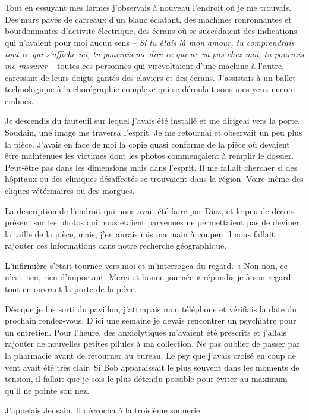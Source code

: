 Tout en essuyant mes larmes j'observais à nouveau l'endroit où je me trouvais. Des murs pavés de carreaux d'un blanc
éclatant, des machines ronronnantes et bourdonnantes d'activité électrique, des écrans où se succédaient des indications
qui n'avaient pour moi aucun sens -- \emph{Si tu étais là mon amour, tu comprendrais tout ce qui s'affiche ici, tu
pourrais me dire ce qui ne va pas chez moi, tu pourrais me rassurer} -- toutes ces personnes qui virevoltaient d'une
machine à l'autre, caressant de leurs doigts gantés des claviers et des écrans. J'assistais à un ballet technologique à 
la chorégraphie complexe qui se déroulait sous mes yeux encore embués.

Je descendis du fauteuil sur lequel j'avais été installé et me dirigeai vers la porte. Soudain, une image me traversa
l'esprit. Je me retournai et observait un peu plus la pièce. J'avais en face de moi la copie quasi conforme de la pièce
où devaient être maintenues les victimes dont les photos commençaient à remplir le dossier. Peut-être pas dans les
dimensions mais dans l'esprit. Il me fallait chercher si des hôpitaux ou des cliniques désaffectés se trouvaient dans la
région. Voire même des cliques vétérinaires ou des morgues.

La description de l'endroit qui nous avait été faire par Diaz, et le peu de décors présent sur les photos qui nous
étaient parvenues ne permettaient pas de deviner la taille de la pièce, mais, j'en aurais mis ma main à couper, il nous
fallait rajouter ces informations dans notre recherche géographique.

L'infirmière s'était tournée vers moi et m'interrogea du regard. « Non non, ce n'est rien, rien d'important. Merci et
bonne journée » répondis-je à son regard tout en ouvrant la porte de la pièce.

Dès que je fus sorti du pavillon, j'attrapais mon téléphone et vérifiais la date du prochain rendez-vous. D'ici une 
semaine je devais rencontrer un psychiatre pour un entretien. Pour l'heure, des anxiolytiques m'avaient été prescrits et 
j'allais rajouter de nouvelles petites pilules à ma collection. Ne pas oublier de passer par la pharmacie avant de 
retourner au bureau. Le psy que j'avais croisé en coup de vent avait été très clair. Si Bob apparaissait le plus souvent 
dans les moments de tension, il fallait que je sois le plus détendu possible pour éviter au maximum qu'il ne pointe son 
nez.

J'appelais Jensain. Il décrocha à la troisième sonnerie.

